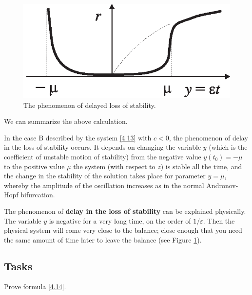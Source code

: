 \begin{figure}[!ht]
	\centering
	\includegraphics [scale=1.4]{jtr48}
	\caption{The phenomenon of delayed loss of stability.}
	\label{fig:4.8}
\end{figure}

We can summarize the above calculation.

\begin{theorem}
	In the case B described by the system \eqref{4.13} with $c <0$, the phenomenon of delay in the loss of stability occurs. It depends on changing the variable $y$ (which is the coefficient of unstable motion of stability) from the negative value $y(t_{0})=-\mu $ to the positive value $\mu $ the system (with respect to $z$) is stable all the time, and the change in the stability of the solution takes place for parameter $y = \mu $, whereby the amplitude of the oscillation increases as in the normal Andronov-Hopf bifurcation.
\end{theorem}

The phenomenon of \textbf{delay in the loss of stability} can be explained physically. The variable $y$ is negative for a very long time, on the order of $1/\varepsilon$. Then the physical system will come very close to the balance; close enough that you need the same amount of time later to leave the balance (see Figure \ref{fig:4.8}).


\subsection*{Tasks}
\begin{task}
	Prove formula \eqref{4.14}.
\end{task}

